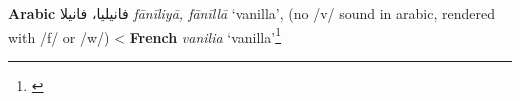 \begin{etymology}\label{ety:faniliya}
\textbf{Arabic} {فانيليا، فانيلا} \textit{fānīliyā, fānīllā} `vanilla', (no /v/ sound in arabic, rendered with /f/ or /w/)
< \textbf{French} \textit{vanilia} `vanilla'\footnote{\textcite[814]{baalbaki_-mawrid_1995}}
\end{etymology}